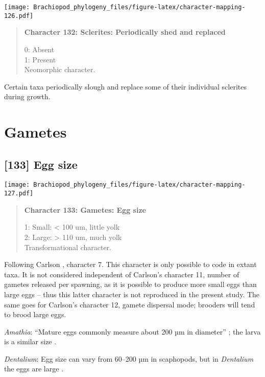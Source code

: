 \documentclass[openany]{book}
\theoremstyle{definition}
\theoremstyle{definition}
\theoremstyle{definition}
\theoremstyle{remark}
\begin{document}
\texttt{[image: Brachiopod\_phylogeny\_files/figure-latex/character-mapping-126.pdf]}

\begin{quote}
\textbf{Character 132: Sclerites: Periodically shed and replaced}

0: Absent\\
1: Present\\
Neomorphic character.
\end{quote}

Certain taxa periodically slough and replace some of their individual
sclerites during growth.

\section{Gametes}\label{gametes}

\subsection*{{[}133{]} Egg size}\label{egg-size}

\texttt{[image: Brachiopod\_phylogeny\_files/figure-latex/character-mapping-127.pdf]}

\begin{quote}
\textbf{Character 133: Gametes: Egg size}

1: Small: \textless{} 100 um, little yolk\\
2: Large: \textgreater{} 110 um, much yolk\\
Transformational character.
\end{quote}

Following Carlson \citeyearpar{Carlson1995Phylogeneticrelationships},
character 7. This character is only possible to code in extant taxa. It
is not considered independent of Carlson's character 11, number of
gametes released per spawning, as it is possible to produce more small
eggs than large eggs -- thus this latter character is not reproduced in
the present study. The same goes for Carlson's character 12, gamete
dispersal mode; brooders will tend to brood large eggs.

\hypertarget{Amathia-coding-133}{}
\emph{Amathia}: ``Mature eggs commonly measure about 200 µm in
diameter'' \citep{Franzen1977}; the larva is a similar size
\citep{Reed1982}.

\hypertarget{Dentalium-coding-133}{}
\emph{Dentalium}: Egg size can vary from 60--200 µm in scaphopods, but
in \emph{Dentalium} the eggs are large \citep{DufresneDube1983}.
\end{document}
